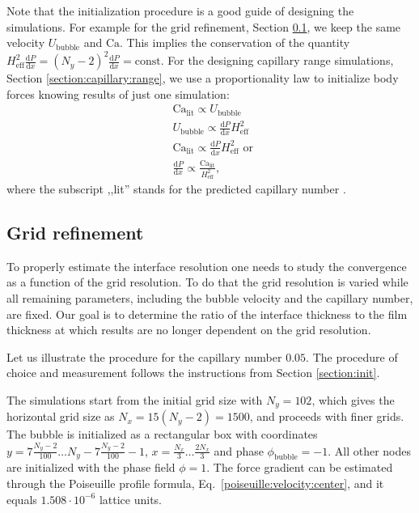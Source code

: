 \documentclass[preprint,12pt]{elsarticle}
\newcommand{\Ca}{\mathrm{Ca}}
\begin{document}
{\color{red}
Note that the initialization procedure is a good guide of designing the simulations. For example
for the grid refinement, Section \ref{section:grid:refinement}, we keep the same velocity
$U_{\mathrm{bubble}}$ and $\Ca$. This implies the conservation of the quantity
$H_{\mathrm{eff}}^2\frac{\mathrm{d}P}{\mathrm{d}x}=(N_y-2)^2\frac{\mathrm{d}P}{\mathrm{d}
x } = \mathrm{const}$. For the designing capillary range simulations, Section
\ref{section:capillary:range}, we use a proportionality law to initialize body forces knowing
results of just one simulation:
\begin{equation}
\begin{aligned}
&\Ca_{\mathrm{lit}} \propto U_{\mathrm{bubble}}\\
&U_{\mathrm{bubble}} \propto \frac{\mathrm{d}P}{\mathrm{d}x} H_{\mathrm{eff}}^2\\
&\Ca_{\mathrm{lit}} \propto \frac{\mathrm{d}P}{\mathrm{d} x} H_{\mathrm{eff}}^2 \text{ or }\\
&\frac{\mathrm{d}P}{\mathrm{d} x} \propto \frac{\Ca_{\mathrm{lit}}}{H_{\mathrm{eff}}^2},
\end{aligned}
\end{equation}
where the subscript ,,lit'' stands for the predicted capillary number
\cite{giavedoni-numerical,heil-bretherton}. 
}
\subsection{Grid refinement}
\label{section:grid:refinement}
To properly estimate the interface resolution one needs to study the convergence as a function of
the grid resolution. To do that the grid resolution is varied while all remaining parameters,
including the bubble velocity and the capillary number, are fixed.  Our goal is to determine the 
ratio of the interface thickness to the 
film thickness at which results are no longer dependent on the grid resolution.

Let us illustrate the procedure for the capillary number
$0.05$. 
{\color{red} The procedure of choice and measurement follows the instructions from Section
\ref{section:init}.
}

The simulations start from the initial grid size with $N_y=102$, which gives the horizontal grid
size as $N_x=15(N_y-2)=1500$, and proceeds with finer grids.
The bubble is initialized as a rectangular box with coordinates
{\color{red}$y=7\frac{N_y-2}{100}\dots N_y-7\frac{N_y-2}{100}-1$}, $x=\frac{N_x}{3}\dots \frac{2
N_x}{3}$ and phase
$\phi_{\mathrm{bubble}}=-1$. All other nodes are initialized with the phase field
$\phi=1$. The force gradient can be estimated through the Poiseuille
profile formula, Eq.~\ref{poiseuille:velocity:center}, and it equals
$1.508 \cdot 10^{-6}$ lattice units.
\end{document}
